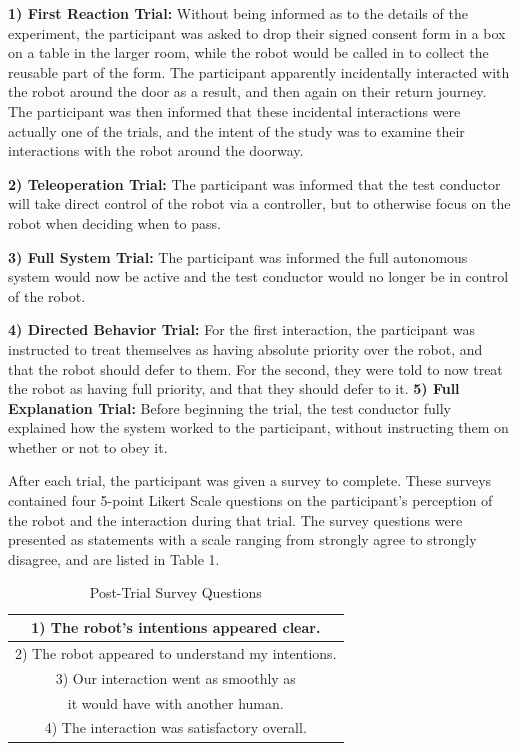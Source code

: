 \documentclass[letterpaper, 10 pt, conference]{ieeeconf}  %
\begin{document}
\textbf{1) First Reaction Trial:} Without being informed as to the details of the experiment, the participant was asked to drop their signed consent form in a box on a table in the larger room, while the robot would be called in to collect the reusable part of the form. The participant apparently incidentally interacted with the robot around the door as a result, and then again on their return journey. The participant was then informed that these incidental interactions were actually one of the trials, and the intent of the study was to examine their interactions with the robot around the doorway.

\textbf{2) Teleoperation Trial:} The participant was informed that the test conductor will take direct control of the robot via a controller, but to otherwise focus on the robot when deciding when to pass. 

\textbf{3) Full System Trial:} The participant was informed the full autonomous system would now be active and the test conductor would no longer be in control of the robot.

\textbf{4) Directed Behavior Trial:} For the first interaction, the participant was instructed to treat themselves as having absolute priority over the robot, and that the robot should defer to them. For the second, they were told to now treat the robot as having full priority, and that they should defer to it.
\textbf{5) Full Explanation Trial:} Before beginning the trial, the test conductor fully explained how the system worked to the participant, without instructing them on whether or not to obey it.%

After each trial, the participant was given a survey to complete. These surveys contained four 5-point Likert Scale questions on the participant’s perception of the robot and the interaction during that trial. The survey questions were presented as statements with a scale ranging from strongly agree to strongly disagree, and are listed in Table 1.

\begin{table}[h]
\caption{Post-Trial Survey Questions}
\label{survey_questions}
\begin{center}
\begin{tabular}{|c|}
\hline
1) The robot’s intentions appeared clear.\\
\hline
2) The robot appeared to understand my intentions.\\
\hline
3) Our interaction went as smoothly as \\
it would have with another human.\\
\hline
4) The interaction was satisfactory overall.\\
\hline
\end{tabular}
\end{center}
\end{table}
\end{document}
